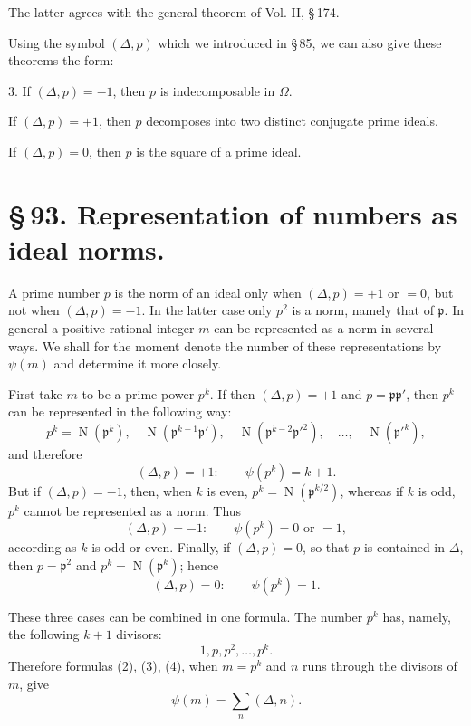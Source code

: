 \documentclass[11pt]{article}
\newcommand{\Norm}{\operatorname{N}}
\begin{document}
The latter agrees with the general theorem of Vol. II, \S\,174.

Using the symbol $(\Delta,p)$ which we introduced in \S\,85, we can also give these theorems the form:

3. If $(\Delta,p)=-1$, then $p$ is indecomposable in $\Omega$.

If $(\Delta,p)=+1$, then $p$ decomposes into two distinct conjugate prime ideals.

If $(\Delta,p)=0$, then $p$ is the square of a prime ideal.

\section*{\S\,93. Representation of numbers as ideal norms.}

A prime number $p$ is the norm of an ideal only when $(\Delta,p)=+1$ or $=0$, but not when $(\Delta,p)=-1$. In the latter case only $p^2$ is a norm, namely that of $\mathfrak p$. In general a positive rational integer $m$ can be represented as a norm in several ways. We shall for the moment denote the number of these representations by $\psi(m)$ and determine it more closely.

First take $m$ to be a prime power $p^k$. If then $(\Delta,p)=+1$ and $p=\mathfrak p\mathfrak p'$, then $p^k$ can be represented in the following way:
\begin{equation}
p^k=\Norm(\mathfrak p^k),\quad
\Norm(\mathfrak p^{k-1}\mathfrak p'),\quad
\Norm(\mathfrak p^{k-2}\mathfrak p'^2),\quad\ldots,\quad
\Norm(\mathfrak p'^k),
\tag{1}
\end{equation}
and therefore
\begin{equation}
(\Delta,p)=+1:\qquad \psi(p^k)=k+1.
\tag{2}
\end{equation}
But if $(\Delta,p)=-1$, then, when $k$ is even, $p^k=\Norm(\mathfrak p^{k/2})$, whereas if $k$ is odd, $p^k$ cannot be represented as a norm. Thus
\begin{equation}
(\Delta,p)=-1:\qquad \psi(p^k)=0\text{ or }=1,
\tag{3}
\end{equation}
according as $k$ is odd or even. Finally, if $(\Delta,p)=0$, so that $p$ is contained in $\Delta$, then $p=\mathfrak p^2$ and $p^k=\Norm(\mathfrak p^k)$; hence
\begin{equation}
(\Delta,p)=0:\qquad \psi(p^k)=1.
\tag{4}
\end{equation}

These three cases can be combined in one formula. The number $p^k$ has, namely, the following $k+1$ divisors:
\begin{equation}
1,p,p^2,\ldots,p^k.
\tag{5}
\end{equation}
Therefore formulas (2), (3), (4), when $m=p^k$ and $n$ runs through the divisors of $m$, give
\begin{equation}
 \psi(m)=\sum_n (\Delta,n).
\tag{6}
\end{equation}
\end{document}
